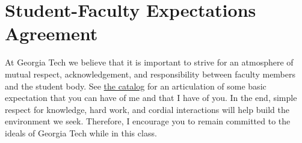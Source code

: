 \documentclass[12pt]{article}
\begin{document}
\section{Student-Faculty Expectations Agreement} 

At Georgia Tech we believe that it is important to strive for an atmosphere of mutual respect, acknowledgement, and responsibility between faculty members and the student body. See \href{http://www.catalog.gatech.edu/rules/22/}{the catalog} for an articulation of some basic expectation that you can have of me and that I have of you. In the end, simple respect for knowledge, hard work, and cordial interactions will help build the environment we seek. Therefore, I encourage you to remain committed to the ideals of Georgia Tech while in this class. 


\end{document}
